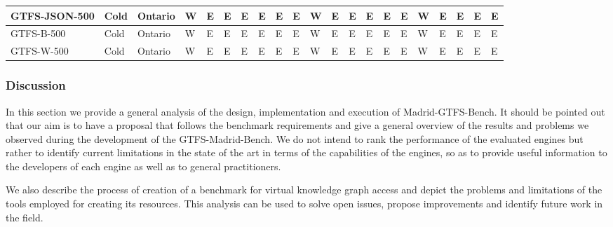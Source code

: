 \begin{table}[]
{\begin{tabular}{|l|l|l|l|l|l|l|l|l|l|l|l|l|l|l|l|l|l|l|l|l|}
GTFS-JSON-500                                           & Cold                   & Ontario        & W           & E           & E           & E           & E           & E           & E           & W           & E           & E            & E            & E            & E            & W            & E            & E            & E            & E            \\ \hline
GTFS-B-500                                              & Cold                   & Ontario        & W           & E           & E           & E           & E           & E           & E           & W           & E           & E            & E            & E            & E            & W            & E            & E            & E            & E            \\ \hline
GTFS-W-500                                              & Cold                   & Ontario        & W           & E           & E           & E           & E           & E           & E           & W           & E           & E            & E            & E            & E            & W            & E            & E            & E            & E            \\ \hline
\end{tabular}%
}
\end{table}

\subsubsection{Discussion}
In this section we provide a general analysis of the design, implementation and execution of Madrid-GTFS-Bench. It should be pointed out that our aim is to have a proposal that follows the benchmark requirements and give a general overview of the results and problems we observed during the development of the GTFS-Madrid-Bench. We do not intend to rank the performance of the evaluated engines but rather to identify current limitations in the state of the art in terms of the capabilities of the engines, so as to provide useful information to the developers of each engine as well as to general practitioners. 

We also describe the process of creation of a benchmark for virtual knowledge graph access and depict the problems and limitations of the tools employed for creating its resources. This analysis can be used to solve open issues, propose improvements and identify future work in the field.

